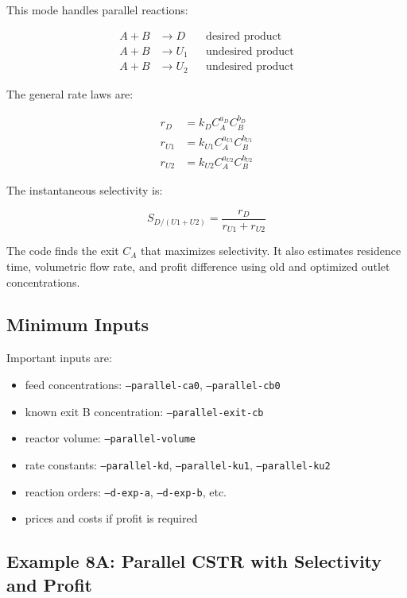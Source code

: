 \documentclass[11pt]{article}
\begin{document}
This mode handles parallel reactions:

\begin{align}
A+B &\to D &&\text{desired product} \\
A+B &\to U_1 &&\text{undesired product} \\
A+B &\to U_2 &&\text{undesired product}
\end{align}

The general rate laws are:

\begin{align}
r_D &= k_D C_A^{a_D}C_B^{b_D} \\
r_{U1} &= k_{U1} C_A^{a_{U1}}C_B^{b_{U1}} \\
r_{U2} &= k_{U2} C_A^{a_{U2}}C_B^{b_{U2}}
\end{align}

The instantaneous selectivity is:

\begin{equation}
S_{D/(U1+U2)} = \frac{r_D}{r_{U1}+r_{U2}}
\end{equation}

The code finds the exit $C_A$ that maximizes selectivity. It also estimates residence time, volumetric flow rate, and profit difference using old and optimized outlet concentrations.

\subsection{Minimum Inputs}

Important inputs are:

\begin{itemize}
    \item feed concentrations: \texttt{--parallel-ca0}, \texttt{--parallel-cb0}
    \item known exit B concentration: \texttt{--parallel-exit-cb}
    \item reactor volume: \texttt{--parallel-volume}
    \item rate constants: \texttt{--parallel-kd}, \texttt{--parallel-ku1}, \texttt{--parallel-ku2}
    \item reaction orders: \texttt{--d-exp-a}, \texttt{--d-exp-b}, etc.
    \item prices and costs if profit is required
\end{itemize}

\subsection{Example 8A: Parallel CSTR with Selectivity and Profit}
\end{document}
